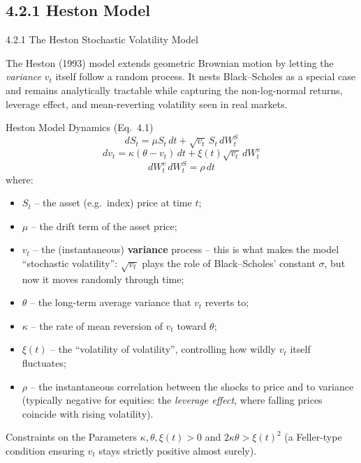 \documentclass[aspectratio=169,10pt]{beamer}
\begin{document}
\subsection{4.2.1 Heston Model}

\begin{frame}[allowframebreaks]{4.2.1 The Heston Stochastic Volatility Model}

The Heston (1993) model extends geometric Brownian motion by letting the
\emph{variance} $v_t$ itself follow a random process. It nests
Black--Scholes as a special case and remains analytically tractable while
capturing the non-log-normal returns, leverage effect, and mean-reverting
volatility seen in real markets.

\begin{block}{Heston Model Dynamics (Eq.\ 4.1)}
\[
  dS_t = \mu S_t\,dt + \sqrt{v_t}\,S_t\,dW_t^S
\]
\[
  dv_t = \kappa(\theta - v_t)\,dt + \xi(t)\sqrt{v_t}\,dW_t^v
\]
\[
  dW_t^v\,dW_t^S = \rho\,dt
\]
where:
\begin{itemize}
  \item $S_t$ -- the asset (e.g.\ index) price at time $t$;
  \item $\mu$ -- the drift term of the asset price;
  \item $v_t$ -- the (instantaneous) \textbf{variance} process -- this is
        what makes the model ``stochastic volatility'': $\sqrt{v_t}$
        plays the role of Black--Scholes' constant $\sigma$, but now it
        moves randomly through time;
  \item $\theta$ -- the long-term average variance that $v_t$ reverts to;
  \item $\kappa$ -- the rate of mean reversion of $v_t$ toward $\theta$;
  \item $\xi(t)$ -- the ``volatility of volatility'', controlling how
        wildly $v_t$ itself fluctuates;
  \item $\rho$ -- the instantaneous correlation between the shocks to
        price and to variance (typically negative for equities: the
        \emph{leverage effect}, where falling prices coincide with rising
        volatility).
\end{itemize}
\end{block}

\framebreak

\begin{alertblock}{Constraints on the Parameters}
$\kappa, \theta, \xi(t) > 0$ and $2\kappa\theta > \xi(t)^2$ (a Feller-type
condition ensuring $v_t$ stays strictly positive almost surely).
\end{alertblock}


\end{frame}
\end{document}

